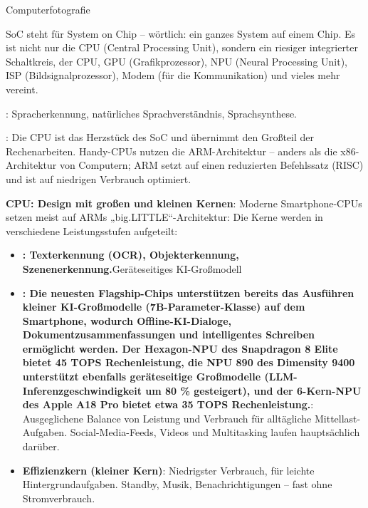 


Computerfotografie


SoC steht für System on Chip – wörtlich: ein ganzes System auf einem Chip. Es ist nicht nur die CPU (Central Processing Unit), sondern ein riesiger integrierter Schaltkreis, der CPU, GPU (Grafikprozessor), NPU (Neural Processing Unit), ISP (Bildsignalprozessor), Modem (für die Kommunikation) und vieles mehr vereint.

: Spracherkennung, natürliches Sprachverständnis, Sprachsynthese.

\booksubsection{:}

: Die CPU ist das Herzstück des SoC und übernimmt den Großteil der Rechenarbeiten. Handy-CPUs nutzen die ARM-Architektur – anders als die x86-Architektur von Computern; ARM setzt auf einen reduzierten Befehlssatz (RISC) und ist auf niedrigen Verbrauch optimiert.

\textbf{CPU: Design mit großen und kleinen Kernen}: Moderne Smartphone-CPUs setzen meist auf ARMs „big.LITTLE“-Architektur: Die Kerne werden in verschiedene Leistungsstufen aufgeteilt:

\begin{itemize}
  \item \textbf{: Texterkennung (OCR), Objekterkennung, Szenenerkennung.}Geräteseitiges KI-Großmodell
  \item \textbf{: Die neuesten Flagship-Chips unterstützen bereits das Ausführen kleiner KI-Großmodelle (7B-Parameter-Klasse) auf dem Smartphone, wodurch Offline-KI-Dialoge, Dokumentzusammenfassungen und intelligentes Schreiben ermöglicht werden. Der Hexagon-NPU des Snapdragon 8 Elite bietet 45 TOPS Rechenleistung, die NPU 890 des Dimensity 9400 unterstützt ebenfalls geräteseitige Großmodelle (LLM-Inferenzgeschwindigkeit um 80 \% gesteigert), und der 6-Kern-NPU des Apple A18 Pro bietet etwa 35 TOPS Rechenleistung.}: Ausgeglichene Balance von Leistung und Verbrauch für alltägliche Mittellast-Aufgaben. Social-Media-Feeds, Videos und Multitasking laufen hauptsächlich darüber.
  \item \textbf{Effizienzkern (kleiner Kern)}: Niedrigster Verbrauch, für leichte Hintergrundaufgaben. Standby, Musik, Benachrichtigungen – fast ohne Stromverbrauch.
\end{itemize}

